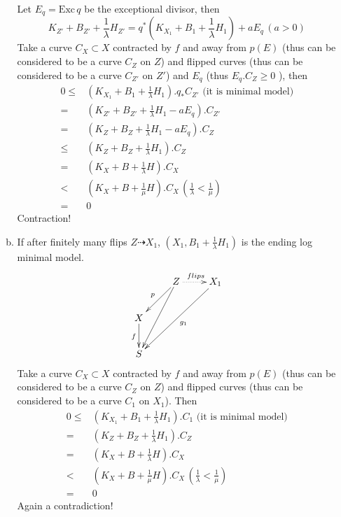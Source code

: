 \documentclass{article}
\begin{document}
\begin{enumerate}[(A)]
\begin{enumerate}[a)]
    Let $ E_q=\mathrm{Exc}\,q $ be the exceptional divisor, then 
    $$ K_{Z'}+B_{Z'}+\frac{1}{\lambda}H_{Z'}=q^*(K_{X_1}+B_1+\frac{1}{\lambda}H_1)+aE_q \,(a>0)$$
    Take a curve $ C_X\subset X $ contracted by $ f $ and away from $ p(E) $ (thus can be considered to be a curve $ C_Z $ on $ Z $) and flipped curves (thus can be considered to be a curve $ C_{Z'} $ on $ Z' $) and $ E_q $ (thus $ E_q.C_Z\geqslant 0 $ ), then
    \begin{equation*}
      \begin{aligned}
        0\leqslant& (K_{X_1}+B_1+\frac{1}{\lambda}H_1).q_*C_{Z'} \text{ (it is minimal model)}\\
        =&(K_{Z'}+B_{Z'}+\frac{1}{\lambda}H_1-aE_q).C_{Z'}\\
        =&(K_{Z}+B_{Z}+\frac{1}{\lambda}H_1-aE_q).C_{Z}\\
        \leqslant &(K_{Z}+B_{Z}+\frac{1}{\lambda}H_1).C_{Z}\\
        =&(K_X+B+\frac{1}{\lambda}H).C_X\\
        <&(K_{X}+B+\frac{1}{\mu}H).C_X  \,(\frac{1}{\lambda}<\frac{1}{\mu})\\
        =&0
      \end{aligned}
    \end{equation*} 
  Contraction!
  \item If after finitely many flips $ Z\dashrightarrow X_1 $,  $ (X_1,B_1+\frac{1}{\lambda}H_1) $ is the ending log minimal model.
    $$ \xymatrix{
    &Z\ar[ld]_p\ar[ldd]\ar@{.>}[r]^{flips}&X_1\ar[lldd]^{g_1}\\
    X\ar[d]_f&&\\
    S &&}$$
    Take a curve $ C_X\subset X $ contracted by $ f $ and away from $ p(E) $ (thus can be considered to be a curve $ C_Z $ on $ Z $) and flipped curves (thus can be considered to be a curve $ C_{1} $ on $X_1$). Then
    \begin{equation*}
      \begin{aligned}
        0\leqslant& (K_{X_1}+B_1+\frac{1}{\lambda}H_1).C_1 \text{ (it is minimal model)}\\
        =&(K_{Z}+B_{Z}+\frac{1}{\lambda}H_1).C_{Z}\\
        = &(K_X+B+\frac{1}{\lambda}H).C_X\\
        <&(K_{X}+B+\frac{1}{\mu}H).C_X  \,(\frac{1}{\lambda}<\frac{1}{\mu})\\
        =&0
      \end{aligned}
    \end{equation*} 
  Again  a contradiction!

\end{enumerate}
\end{enumerate}
\end{document}
